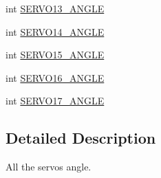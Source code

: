 \begin{DoxyCompactItemize}
\item 
int \hyperlink{struct__RobotServo_ac1530cdca5a387c5ccc941d3891af08d}{S\-E\-R\-V\-O13\-\_\-\-A\-N\-G\-L\-E}
\item 
int \hyperlink{struct__RobotServo_a50ead1cc511b9ea1618bc9e59e514088}{S\-E\-R\-V\-O14\-\_\-\-A\-N\-G\-L\-E}
\item 
int \hyperlink{struct__RobotServo_acf3c875be25e00720f65d74061aa7e0a}{S\-E\-R\-V\-O15\-\_\-\-A\-N\-G\-L\-E}
\item 
int \hyperlink{struct__RobotServo_a14c22b0274e8410f07dbf4f6583810bd}{S\-E\-R\-V\-O16\-\_\-\-A\-N\-G\-L\-E}
\item 
int \hyperlink{struct__RobotServo_a5cba65ebea9f2146007555e299ec9b91}{S\-E\-R\-V\-O17\-\_\-\-A\-N\-G\-L\-E}
\end{DoxyCompactItemize}


\subsection{Detailed Description}
All the servos angle. 

